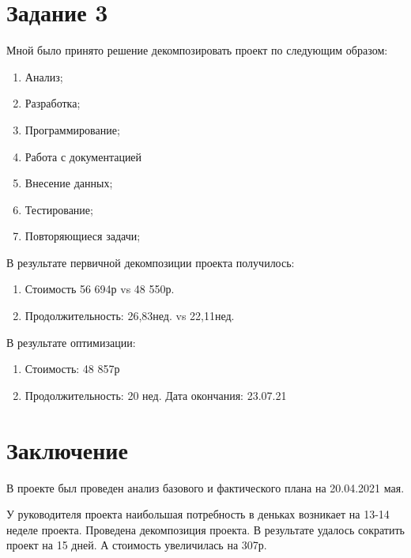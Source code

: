 \section{Задание 3}
Мной было принято решение декомпозировать проект по следующим образом:
\begin{enumerate}
	\item Анализ;
	\item Разработка;
	\item Программирование;
	\item Работа с документацией
	\item Внесение данных;
	\item Тестирование;
	\item Повторяющиеся задачи;
\end{enumerate}

В результате первичной декомпозиции проекта получилось:
\begin{enumerate}
	\item Стоимость 56 694р vs 48 550р.
	\item Продолжительность: 26,83нед. vs 22,11нед.
\end{enumerate}

В результате оптимизации:
\begin{enumerate}
	\item Стоимость: 48 857р
	\item Продолжительность: 20 нед. Дата окончания: 23.07.21
\end{enumerate}

\section{Заключение}
В проекте был проведен анализ базового и фактического плана на 20.04.2021 мая.

У руководителя проекта наибольшая потребность в деньках возникает на 13-14 неделе проекта.
Проведена декомпозиция проекта. В результате удалось сократить проект на 15 дней.
А стоимость увеличилась на 307р.






